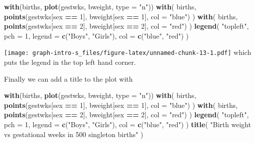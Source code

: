 \documentclass[
]{book}
\newenvironment{Shaded}{\begin{snugshade}}{\end{snugshade}}
\newcommand{\AttributeTok}[1]{\textcolor[rgb]{0.13,0.29,0.53}{#1}}
\newcommand{\DecValTok}[1]{\textcolor[rgb]{0.00,0.00,0.81}{#1}}
\newcommand{\FunctionTok}[1]{\textcolor[rgb]{0.13,0.29,0.53}{\textbf{#1}}}
\newcommand{\NormalTok}[1]{#1}
\newcommand{\SpecialCharTok}[1]{\textcolor[rgb]{0.81,0.36,0.00}{\textbf{#1}}}
\newcommand{\StringTok}[1]{\textcolor[rgb]{0.31,0.60,0.02}{#1}}
\begin{document}
\begin{Shaded}
\begin{Highlighting}[]
\FunctionTok{with}\NormalTok{(births, }\FunctionTok{plot}\NormalTok{(gestwks, bweight, }\AttributeTok{type =} \StringTok{"n"}\NormalTok{))}
\FunctionTok{with}\NormalTok{(}
\NormalTok{  births, }
  \FunctionTok{points}\NormalTok{(gestwks[sex }\SpecialCharTok{==} \DecValTok{1}\NormalTok{], bweight[sex }\SpecialCharTok{==} \DecValTok{1}\NormalTok{], }\AttributeTok{col =} \StringTok{"blue"}\NormalTok{)}
\NormalTok{)}
\FunctionTok{with}\NormalTok{(}
\NormalTok{  births, }
  \FunctionTok{points}\NormalTok{(gestwks[sex }\SpecialCharTok{==} \DecValTok{2}\NormalTok{], bweight[sex }\SpecialCharTok{==} \DecValTok{2}\NormalTok{], }\AttributeTok{col =} \StringTok{"red"}\NormalTok{)}
\NormalTok{)}
\FunctionTok{legend}\NormalTok{(}
  \StringTok{"topleft"}\NormalTok{, }
  \AttributeTok{pch =} \DecValTok{1}\NormalTok{, }
  \AttributeTok{legend =} \FunctionTok{c}\NormalTok{(}\StringTok{"Boys"}\NormalTok{, }\StringTok{"Girls"}\NormalTok{), }
  \AttributeTok{col =} \FunctionTok{c}\NormalTok{(}\StringTok{"blue"}\NormalTok{, }\StringTok{"red"}\NormalTok{)}
\NormalTok{)}
\end{Highlighting}
\end{Shaded}

\texttt{[image: graph-intro-s\_files/figure-latex/unnamed-chunk-13-1.pdf]}
which puts the legend in the top left hand corner.

Finally we can add a title to the plot with

\begin{Shaded}
\begin{Highlighting}[]
\FunctionTok{with}\NormalTok{(births, }\FunctionTok{plot}\NormalTok{(gestwks, bweight, }\AttributeTok{type =} \StringTok{"n"}\NormalTok{))}
\FunctionTok{with}\NormalTok{(}
\NormalTok{  births, }
  \FunctionTok{points}\NormalTok{(gestwks[sex }\SpecialCharTok{==} \DecValTok{1}\NormalTok{], bweight[sex }\SpecialCharTok{==} \DecValTok{1}\NormalTok{], }\AttributeTok{col =} \StringTok{"blue"}\NormalTok{)}
\NormalTok{)}
\FunctionTok{with}\NormalTok{(}
\NormalTok{  births, }
  \FunctionTok{points}\NormalTok{(gestwks[sex }\SpecialCharTok{==} \DecValTok{2}\NormalTok{], bweight[sex }\SpecialCharTok{==} \DecValTok{2}\NormalTok{], }\AttributeTok{col =} \StringTok{"red"}\NormalTok{)}
\NormalTok{)}
\FunctionTok{legend}\NormalTok{(}
  \StringTok{"topleft"}\NormalTok{, }
  \AttributeTok{pch =} \DecValTok{1}\NormalTok{, }
  \AttributeTok{legend =} \FunctionTok{c}\NormalTok{(}\StringTok{"Boys"}\NormalTok{, }\StringTok{"Girls"}\NormalTok{), }
  \AttributeTok{col =} \FunctionTok{c}\NormalTok{(}\StringTok{"blue"}\NormalTok{, }\StringTok{"red"}\NormalTok{)}
\NormalTok{)}
\FunctionTok{title}\NormalTok{(}
  \StringTok{"Birth weight vs gestational weeks in 500 singleton births"}
\NormalTok{)}
\end{Highlighting}
\end{Shaded}
\end{document}

